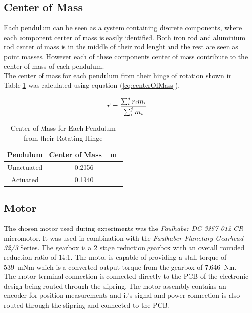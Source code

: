 \subsection{Center of Mass}
Each pendulum can be seen as a system containing discrete components, where each component center of mass is easily identified. Both iron rod and aluminium rod center of mass is in the middle of their rod lenght and the rest are seen as point masses. However each of these components center of mass contribute to the center of mass of each pendulum.\\

The center of mass for each pendulum from their hinge of rotation shown in Table \ref{table:centerOfMass} was calculated using equation (\ref{eq:centerOfMass}).

\begin{equation} \label{eq:centerOfMass}
\vec{\boldmath{r}} = \frac{\sum_{i}^{j}r_{i}m_{i}}{\sum_{i}^{j}m_{i}}
\end{equation}

\begin{table}[]
	\centering
	\begin{tabular}{|c|c|}
		\hline
		Pendulum & Center of Mass [\SI{}{m}] \\
		\hline
		\hline
		Unactuated  & \SI{0.2056}{} \\
		\hline
		Actuated  & \SI{0.1940}{} \\
		\hline
	\end{tabular}
	\caption{Center of Mass for Each Pendulum from their Rotating Hinge}
	\label{table:centerOfMass}
\end{table}


\subsection{Motor}
The chosen motor used during experiments was the \textit{Faulhaber DC 3257 012 CR} micromotor. It was used in combination with the \textit{Faulhaber Planetary Gearhead 32/3} Series. The gearbox is a 2 stage reduction gearbox with an overall rounded reduction ratio of 14:1. The motor is capable of providing a stall torque of \SI{539}{mNm} which is a converted output torque from the gearbox of \SI{7.646}{Nm}.\\

The motor terminal connection is connected directly to the PCB of the electronic design being routed through the slipring. The motor assembly contains an encoder for position measurements and it's signal and power connection is also routed through the slipring and connected to the PCB.\\

